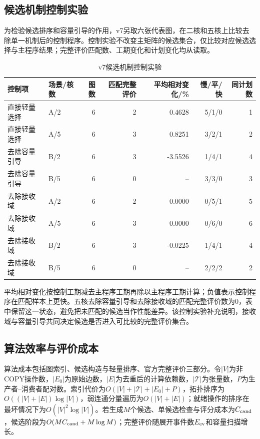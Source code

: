 \subsection{候选机制控制实验}
为检验候选排序和容量引导的作用，v7另取六张代表图，在二核和五核上比较去除单一机制后的控制程序。控制实验不改变主矩阵的候选集合，仅比较对应候选选择与主程序结果；完整评价匹配数、工期变化和计划变化均从读取。
\begin{table}[H]\centering\scriptsize
\caption{v7候选机制控制实验}
\label{tab:controls-v7}
\setlength{\tabcolsep}{3pt}
\begin{tabular}{llrrrrr}\toprule
控制项 & 场景/核数 & 图数 & 匹配完整评价 & 平均相对变化/\% & 慢/平/快 & 同计划数\\\midrule
直接轻量选择 & A/2 & 6 & 2 & 0.4628 & 5/1/0 & 1\\
直接轻量选择 & A/5 & 6 & 3 & 0.8251 & 3/2/1 & 2\\
去除容量引导 & B/2 & 6 & 3 & -3.5526 & 1/4/1 & 4\\
去除容量引导 & B/5 & 6 & 0 & -- & 3/3/0 & 3\\
去除接收域 & A/2 & 6 & 2 & 0.0000 & 0/5/1 & 5\\
去除接收域 & A/5 & 6 & 3 & 0.0000 & 0/6/0 & 6\\
去除接收域 & B/2 & 6 & 3 & -0.0225 & 1/4/1 & 4\\
去除接收域 & B/5 & 6 & 0 & -- & 2/2/2 & 2\\\bottomrule
\end{tabular}
\end{table}
平均相对变化按控制工期减去主程序工期再除以主程序工期计算；负值表示控制程序在匹配样本上更快。五核去除容量引导和去除接收域的匹配完整评价数为0，表中保留这一状态，避免把未匹配的候选当作性能差异。该控制实验补充说明，接收域与容量引导共同决定候选是否进入可比较的完整评价集合。

\subsection{算法效率与评价成本}
算法成本包括图索引、候选构造与轻量排序、官方完整评价三部分。令$|V|$为非COPY操作数，$|E_0|$为原始边数，$|E|$为去重后的计算依赖数，$|\mathcal T|$为张量数，$P$为生产者--消费者配对数。索引代价为$O(|V|+|\mathcal T|+|E_0|+P)$，拓扑排序为$O((|V|+|E|)\log|V|)$，弱连通分量遍历为$O(|V|+|E|)$；就绪操作的排序在最坏情况下为$O(|V|^2\log|V|)$。若生成$M$个候选、单候选检查与评分成本为$C_{\rm cand}$，候选阶段为$O(MC_{\rm cand}+M\log M)$；完整评价随展开事件数$E_{\rm ev}$和容量扫描增长。

